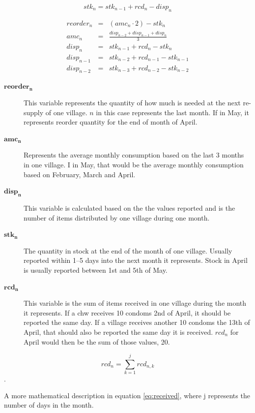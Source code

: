 \begin{equation}
stk_{n} = stk_{n-1} + rcd_{n} - disp_{n}
\end{equation}

\begin{eqnarray}
reorder_{n} & = & (amc_{n} \cdot 2) - stk_{n} \\
amc_{n} & = & \frac{disp_{n-2} + disp_{n-1} + disp_{n}}{3} \\
disp_{n} & = & stk_{n-1} + rcd_{n} - stk_{n} \\
disp_{n-1} & = & stk_{n-2} + rcd_{n-1} - stk_{n-1} \\
disp_{n-2} & = & stk_{n-3} + rcd_{n-2} - stk_{n-2}
\end{eqnarray}


\begin{description}
\item[$\mathbf{reorder_{n}}$]
This variable represents the quantity of how much is needed at the next re-supply of one village. $n$ in this case represents the last month. If in May, it represents reorder quantity for the end of month of April.
\item[$\mathbf{amc_{n}}$]
Represents the average monthly consumption based on the last 3 months in one village. I in May, that would be the average monthly consumption based on February, March and April.
\item[$\mathbf{disp_{n}}$]
This variable is calculated based on the the values reported and is the number of items distributed by one village during one month.
\item[$\mathbf{stk_{n}}$]
The quantity in stock at the end of the month of one village. Usually reported within 1--5 days into the next month it represents. Stock in April is usually reported between 1st and 5th of May.
\item[$\mathbf{rcd_{n}}$]
This variable is the sum of items received in one village during the month it represents. If a \gls{chw} receives 10 condoms 2nd of April, it should be reported the same day. If a village receives another 10 condoms the 13th of April, that should also be reported the same day it is received. $rcd_{n}$ for April would then be the sum of those values, 20.
\end{description}

\begin{equation}
rcd_{n} = \sum_{k = 1}^{j} rcd_{n,k}
\label{eq:received}
\end{equation}.

A more mathematical description in equation \ref{eq:received}, where j represents the number of days in the month.






